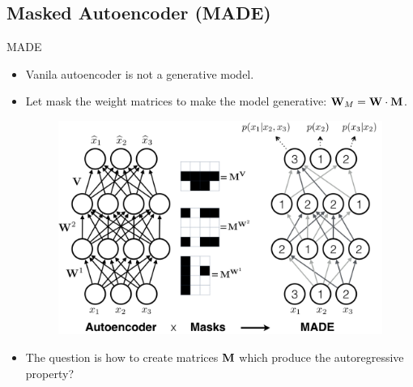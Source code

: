 \documentclass{beamer}
\begin{document}
\subsection{Masked Autoencoder (MADE)}
\begin{frame}{MADE}
	\begin{itemize}
		\item Vanila autoencoder is not a generative model.
		\item Let mask the weight matrices to make the model generative: $\mathbf{W}_M = \mathbf{W} \cdot \mathbf{M}$.
		\begin{figure}
		    \centering
		    \includegraphics[width=0.7\linewidth]{figs/made}
		\end{figure}
		\item The question is how to create matrices $\mathbf{M}$ which produce the autoregressive property?
	\end{itemize}
\end{frame}
\end{document}
